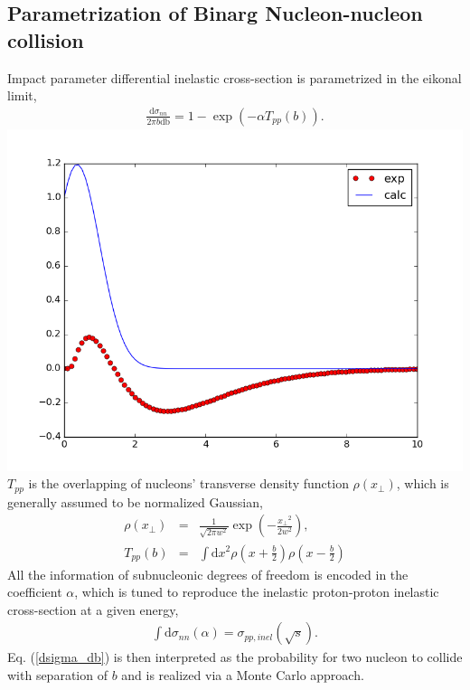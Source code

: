 \documentclass[10pt,a4paper, twocolumn]{article}
\begin{document}
	\subsection{Parametrization of Binarg Nucleon-nucleon collision}
	Impact parameter differential inelastic cross-section is parametrized in the eikonal limit,
	\begin{eqnarray}\label{dsigma_db}
		\frac{\mathrm{d}\sigma_{nn}}{2\pi b \mathrm{db}} = 1 - \exp\left(-\alpha T_{pp} (b)\right).
	\end{eqnarray}
	\includegraphics[width=\columnwidth]{pics/place_holder.png}
	$T_{pp}$ is the overlapping of nucleons' transverse density function $\rho(x_\perp)$, which is generally assumed to be normalized Gaussian,
	\begin{eqnarray}
		\rho(x_\perp) &=& \frac{1}{\sqrt{2\pi w^2}}\exp\left(-\frac{{x_\perp}^2}{2w^2}\right), \\
		T_{pp}(b) &=& \int \mathrm{d}{x}^2 \rho(x+\frac{b}{2})\rho(x-\frac{b}{2})
	\end{eqnarray}
	All the information of subnucleonic degrees of freedom is encoded in the coefficient $\alpha$, which is tuned to reproduce the inelastic proton-proton inelastic cross-section at a given energy,
	\begin{eqnarray}
		\int \mathrm{d}\sigma_{nn}(\alpha) = \sigma_{pp, inel}(\sqrt{s}).
	\end{eqnarray}
	Eq. (\ref{dsigma_db}) is then interpreted as the probability for two nucleon to collide with separation of $b$ and is realized via a Monte Carlo approach.
\end{document}

